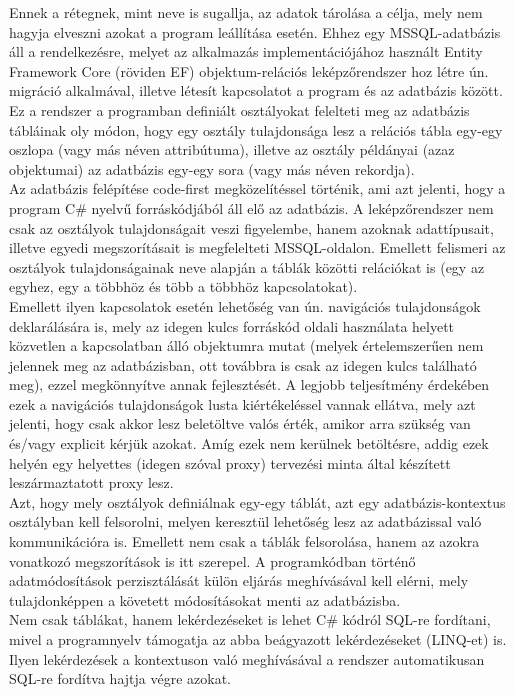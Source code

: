 Ennek a rétegnek, mint neve is sugallja, az adatok tárolása a célja, mely nem hagyja elveszni azokat a program leállítása esetén. Ehhez egy MSSQL-adatbázis áll a rendelkezésre, melyet az alkalmazás implementációjához használt Entity Framework Core (röviden EF) objektum-relációs leképzőrendszer hoz létre ún. migráció alkalmával, illetve létesít kapcsolatot a program és az adatbázis között. Ez a rendszer a programban definiált osztályokat felelteti meg az adatbázis tábláinak oly módon, hogy egy osztály tulajdonsága lesz a relációs tábla egy-egy oszlopa (vagy más néven attribútuma), illetve az osztály példányai (azaz objektumai) az adatbázis egy-egy sora (vagy más néven rekordja).\\
Az adatbázis felépítése code-first megközelítéssel történik, ami azt jelenti, hogy a program C\# nyelvű forráskódjából áll elő az adatbázis. A leképzőrendszer nem csak az osztályok tulajdonságait veszi figyelembe, hanem azoknak adattípusait, illetve egyedi megszorításait is megfelelteti MSSQL-oldalon. Emellett felismeri az osztályok tulajdonságainak neve alapján a táblák közötti relációkat is (egy az egyhez, egy a többhöz és több a többhöz kapcsolatokat).\\
Emellett ilyen kapcsolatok esetén lehetőség van ún. navigációs tulajdonságok deklarálására is, mely az idegen kulcs forráskód oldali használata helyett közvetlen a kapcsolatban álló objektumra mutat (melyek értelemszerűen nem jelennek meg az adatbázisban, ott továbbra is csak az idegen kulcs található meg), ezzel megkönnyítve annak fejlesztését. A legjobb teljesítmény érdekében ezek a navigációs tulajdonságok lusta kiértékeléssel vannak ellátva, mely azt jelenti, hogy csak akkor lesz beletöltve valós érték, amikor arra szükség van és/vagy explicit kérjük azokat. Amíg ezek nem kerülnek betöltésre, addig ezek helyén egy helyettes (idegen szóval proxy) tervezési minta által készített leszármaztatott proxy lesz.\\
Azt, hogy mely osztályok definiálnak egy-egy táblát, azt egy adatbázis-kontextus osztályban kell felsorolni, melyen keresztül lehetőség lesz az adatbázissal való kommunikációra is. Emellett nem csak a táblák felsorolása, hanem az azokra vonatkozó megszorítások is itt szerepel. A programkódban történő adatmódosítások perzisztálását külön eljárás meghívásával kell elérni, mely tulajdonképpen a követett módosításokat menti az adatbázisba.\\
Nem csak táblákat, hanem lekérdezéseket is lehet C\# kódról SQL-re fordítani, mivel a programnyelv támogatja az abba beágyazott lekérdezéseket (LINQ-et) is. Ilyen lekérdezések a kontextuson való meghívásával a rendszer automatikusan SQL-re fordítva hajtja végre azokat.

